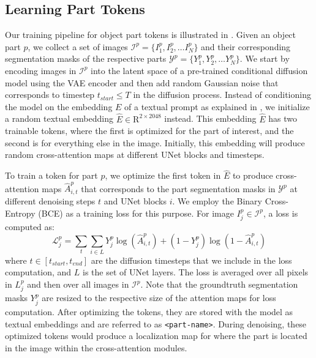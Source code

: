 
\subsection{Learning Part Tokens} 
Our training pipeline for object part tokens is illustrated in .
Given an object part $p$, we collect a set of images $\mathcal{I}^p= \{ I_1^p, I_2^p, \dots I_N^p \}$ and their corresponding segmentation masks of the respective parts $ \mathcal{Y}^p= \{ Y_1^p, Y_2^p, \dots Y_N^p \}$.
We start by encoding images in $\mathcal{I}^p$ into the latent space of a pre-trained conditional diffusion model using the VAE encoder and then add random Gaussian noise that corresponds to timestep $t_{start} \leq T$ in the diffusion process.
Instead of conditioning the model on the embedding $E$ of a textual prompt as explained in 
, we initialize a random textual embedding  $\hat{E} \in \mathrm{R}^{2 \times 2048}$ instead.
This embedding $\hat{E}$ has two trainable tokens, where the first is optimized for the part of interest, and the second is for everything else in the image.
Initially, this embedding will produce random cross-attention maps at different UNet blocks and timesteps.

To train a token for part $p$, we optimize the first token in $\hat{E}$ to produce cross-attention maps $\hat{A}_{i,t}^p$ that corresponds to the part segmentation masks in $\mathcal{Y}^p$ at different denoising steps $t$ and UNet blocks $i$. 
We employ the Binary Cross-Entropy (BCE) as a training loss for this purpose.
For image $I_j^p \in \mathcal{I}^p$, a loss is computed as: 
\begin{equation}
    \mathcal{L}_j^p = \sum_{t} \sum_{i \in L}  Y_j^p \log(\hat{A}_{i,t}^p) + (1 - Y_j^p) \log(1 - \hat{A}_{i,t}^p) 
\end{equation}
where $t \in [t_{start}, t_{end}]$ are the diffusion timesteps that we include in the loss computation, and $L$ is the set of UNet layers.
The loss is averaged over all pixels in ${L}_j^p$ and then over all images in $\mathcal{I}^p$.
Note that the groundtruth segmentation masks $Y_j^p$ are resized to the respective size of the attention maps for loss computation.
After optimizing the tokens, they are stored with the model as textual embeddings and are referred to as \texttt{<part-name>}.
During denoising, these optimized tokens would produce a localization map for where the part is located in the image within the cross-attention modules.


